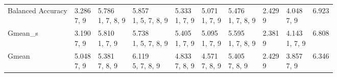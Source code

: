 \begin{tabular}{llllllllll}
Balanced Accuracy &                    \makecell{3.286 \\ \scriptsize{7, 9}} &  \makecell{5.786 \\ \scriptsize{1, 7, 8, 9}} &  \makecell{5.857 \\ \scriptsize{1, 5, 7, 8, 9}} &  \makecell{5.333 \\ \scriptsize{1, 7, 9}} &  \makecell{5.071 \\ \scriptsize{1, 7, 9}} &     \makecell{5.476 \\ \scriptsize{1, 7, 8, 9}} &     \makecell{2.429 \\ \scriptsize{9}} &     \makecell{4.048 \\ \scriptsize{7, 9}} &  \makecell{6.923 \\ \scriptsize{}} \\
Gmean_s           &                    \makecell{3.190 \\ \scriptsize{7, 9}} &     \makecell{5.810 \\ \scriptsize{1, 7, 9}} &  \makecell{5.738 \\ \scriptsize{1, 5, 7, 8, 9}} &  \makecell{5.405 \\ \scriptsize{1, 7, 9}} &  \makecell{5.095 \\ \scriptsize{1, 7, 9}} &     \makecell{5.595 \\ \scriptsize{1, 7, 8, 9}} &     \makecell{2.381 \\ \scriptsize{9}} &  \makecell{4.143 \\ \scriptsize{1, 7, 9}} &  \makecell{6.808 \\ \scriptsize{}} \\
Gmean             &                    \makecell{5.048 \\ \scriptsize{7, 9}} &     \makecell{5.381 \\ \scriptsize{7, 8, 9}} &     \makecell{6.119 \\ \scriptsize{5, 7, 8, 9}} &  \makecell{4.833 \\ \scriptsize{7, 8, 9}} &  \makecell{4.571 \\ \scriptsize{7, 8, 9}} &        \makecell{5.405 \\ \scriptsize{7, 8, 9}} &     \makecell{2.429 \\ \scriptsize{9}} &     \makecell{3.857 \\ \scriptsize{7, 9}} &  \makecell{6.346 \\ \scriptsize{}} \\
\bottomrule
\end{tabular}
